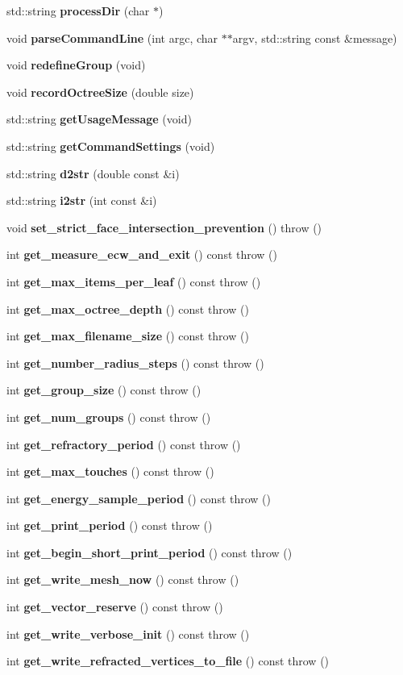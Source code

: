 \begin{CompactItemize}
\item 
std::string {\bf process\-Dir} (char $\ast$)
\item 
void {\bf parse\-Command\-Line} (int argc, char $\ast$$\ast$argv, std::string const \&message)
\item 
void {\bf redefine\-Group} (void)
\item 
void {\bf record\-Octree\-Size} (double size)
\item 
std::string {\bf get\-Usage\-Message} (void)
\item 
std::string {\bf get\-Command\-Settings} (void)
\item 
std::string {\bf d2str} (double const \&i)
\item 
std::string {\bf i2str} (int const \&i)
\item 
void {\bf set\_\-strict\_\-face\_\-intersection\_\-prevention} ()  throw ()
\item 
int {\bf get\_\-measure\_\-ecw\_\-and\_\-exit} () const  throw ()
\item 
int {\bf get\_\-max\_\-items\_\-per\_\-leaf} () const  throw ()
\item 
int {\bf get\_\-max\_\-octree\_\-depth} () const  throw ()
\item 
int {\bf get\_\-max\_\-filename\_\-size} () const  throw ()
\item 
int {\bf get\_\-number\_\-radius\_\-steps} () const  throw ()
\item 
int {\bf get\_\-group\_\-size} () const  throw ()
\item 
int {\bf get\_\-num\_\-groups} () const  throw ()
\item 
int {\bf get\_\-refractory\_\-period} () const  throw ()
\item 
int {\bf get\_\-max\_\-touches} () const  throw ()
\item 
int {\bf get\_\-energy\_\-sample\_\-period} () const  throw ()
\item 
int {\bf get\_\-print\_\-period} () const  throw ()
\item 
int {\bf get\_\-begin\_\-short\_\-print\_\-period} () const  throw ()
\item 
int {\bf get\_\-write\_\-mesh\_\-now} () const  throw ()
\item 
int {\bf get\_\-vector\_\-reserve} () const  throw ()
\item 
int {\bf get\_\-write\_\-verbose\_\-init} () const  throw ()
\item 
int {\bf get\_\-write\_\-refracted\_\-vertices\_\-to\_\-file} () const  throw ()
$$
\end{CompactItemize}
